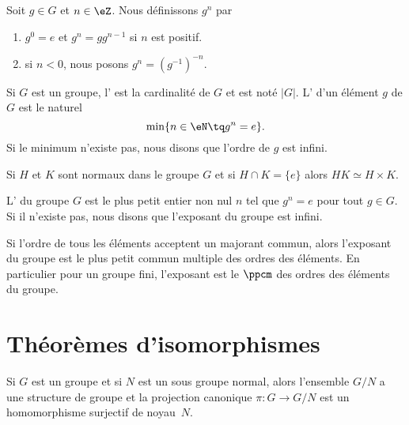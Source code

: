 \begin{definition}
    Soit \( g\in G\) et \( n\in \eZ\). Nous définissons \( g^n\) par
    \begin{enumerate}
        \item
            \( g^0=e\) et \( g^n=gg^{n-1}\) si \( n\) est positif.
        \item
            si \( n<0\), nous posons \( g^n=(g^{-1})^{-n}\).
    \end{enumerate}
\end{definition}

\begin{definition}
    Si \( G\) est un groupe, l' est la cardinalité de \( G\) et est noté \( | G |\). L' d'un élément \( g\) de \( G\) est le naturel
    \begin{equation}
        \min\{ n\in\eN\tq g^n=e \}.
    \end{equation}
    Si le minimum n'existe pas, nous disons que l'ordre de \( g\) est infini.
\end{definition}

\begin{lemma}\label{LemHUkMxp}
    Si \( H\) et \( K\) sont normaux dans le groupe \( G\) et si \( H\cap K=\{ e \}\) alors \( HK\simeq H\times K\).
\end{lemma}

\begin{definition}
    L' du groupe \( G\) est le plus petit entier non nul \( n\) tel que \( g^n=e\) pour tout \( g\in G\). Si il n'existe pas, nous disons que l'exposant du groupe est infini.
\end{definition}
Si l'ordre de tous les éléments acceptent un majorant commun, alors l'exposant du groupe est le plus petit commun multiple des ordres des éléments. En particulier pour un groupe fini, l'exposant est le $\ppcm$ des ordres des éléments du groupe.

\section{Théorèmes d'isomorphismes}

Si \( G\) est un groupe et si \( N\) est un sous groupe normal, alors l'ensemble \( G/N\) a une structure de groupe et la projection canonique \( \pi\colon G\to G/N\) est un homomorphisme surjectif de noyau~\( N\).

